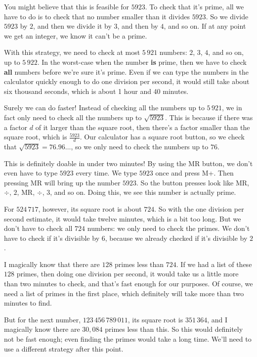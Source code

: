 \documentclass[11pt,paper=letter]{scrartcl}
\begin{document}
You might believe that this is feasible for $5923$. To check that it's prime, all we have to do is to check that no number smaller than it divides $5923$. So we divide $5923$ by $2$, and then we divide it by $3$, and then by $4$, and so on. If at any point we get an integer, we know it can't be a prime.

With this strategy, we need to check at most $5\,921$ numbers: $2$, $3$, $4$, and so on, up to $5\,922$. In the worst-case when the number \textbf{is} prime, then we have to check \textbf{all} numbers before we're sure it's prime. Even if we can type the numbers in the calculator quickly enough to do one division per second, it would still take about six thousand seconds, which is about 1 hour and 40 minutes.

Surely we can do faster! Instead of checking all the numbers up to $5\,921$, we in fact only need to check all the numbers up to $\sqrt{5923}$. This is because if there was a factor $d$ of it larger than the square root, then there's a factor smaller than the square root, which is $\frac{5923}{d}$. Our calculator has a square root button, so we check that $\sqrt{5923} = 76.96\ldots$, so we only need to check the numbers up to $76$.

This is definitely doable in under two minutes! By using the MR button, we don't even have to type $5923$ every time. We type $5923$ once and press M+. Then pressing MR will bring up the number $5923$. So the button presses look like MR, $\div$, $2$, MR, $\div$, $3$, and so on. Doing this, we see this number is actually prime.

For $524\,717$, however, its square root is about $724$. So with the one division per second estimate, it would take twelve minutes, which is a bit too long. But we don't have to check all $724$ numbers: we only need to check the primes. We don't have to check if it's divisible by $6$, because we already checked if it's divisible by $2$.

I magically know that there are $128$ primes less than $724$. If we had a list of these $128$ primes, then doing one division per second, it would take us a little more than two minutes to check, and that's fast enough for our purposes. Of course, we need a list of primes in the first place, which definitely will take more than two minutes to find.

But for the next number, $123\,456\,789\,011$, its square root is $351\,364$, and I magically know there are $30,084$ primes less than this. So this would definitely not be fast enough; even finding the primes would take a long time. We'll need to use a different strategy after this point.
\end{document}
